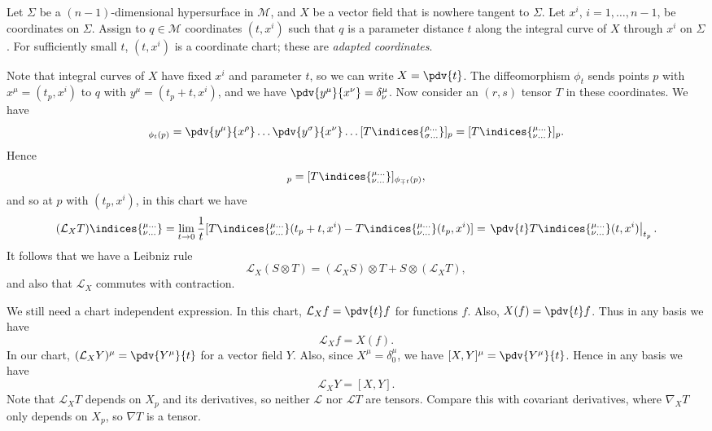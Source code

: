 \documentclass{jknotes}
\begin{document}
\begin{defn}
    Let \(\Sigma\) be a \((n-1)\)-dimensional hypersurface in \(\mathcal{M}\), and \(X\) be a vector field that is nowhere tangent to \(\Sigma\). Let \(x^i\), \(i=1,\dots,n-1\), be coordinates on \(\Sigma\). Assign to \(q\in\mathcal{M}\) coordinates \((t,x^i)\) such that \(q\) is a parameter distance \(t\) along the integral curve of \(X\) through \(x^i\) on \(\Sigma\). For sufficiently small \(t\), \((t,x^i)\) is a coordinate chart; these are \emph{adapted coordinates}.
\end{defn}
Note that integral curves of \(X\) have fixed \(x^i\) and parameter \(t\), so we can write \(X=\pdv{t}\). The diffeomorphism \(\phi_t\) sends points \(p\) with \(x^\mu = (t_p,x^i)\) to \(q\) with \(y^\mu = (t_p+t,x^i)\), and we have \(\pdv{y^\mu}{x^\nu} = \delta^\mu_\nu\). Now consider an \((r,s)\) tensor \(T\) in these coordinates. We have
\begin{equation}
    [((\phi_t)_*T)\indices{^{\mu\dots}_{\nu\dots}}]_{\phi_t(p)} = \pdv{y^\mu}{x^\rho}\dots\pdv{y^\sigma}{x^\nu}\dots[T\indices{^{\rho\dots}_{\sigma\dots}}]_p = [T\indices{^{\mu\dots}_{\nu\dots}}]_p.
\end{equation}
Hence
\begin{equation}
    [((\phi_{\pm t})_*T)\indices{^{\mu\dots}_{\nu\dots}}]_p = [T\indices{^{\mu\dots}_{\nu\dots}}]_{\phi_{\mp t}(p)},
\end{equation}
and so at \(p\) with \((t_p,x^i)\), in this chart we have
\begin{equation}
    (\mathcal{L}_XT)\indices{^{\mu\dots}_{\nu\dots}} = \lim_{t\to0}\frac1t[T\indices{^{\mu\dots}_{\nu\dots}}(t_p+t,x^i)-T\indices{^{\mu\dots}_{\nu\dots}}(t_p,x^i)] = \left.\pdv{t} T\indices{^{\mu\dots}_{\nu\dots}}(t,x^i)\right|_{t_p}.
\end{equation}
It follows that we have a Leibniz rule
\begin{equation}
    \mathcal{L}_X(S\otimes T) = (\mathcal{L}_XS)\otimes T + S\otimes(\mathcal{L}_XT),
\end{equation}
and also that \(\mathcal{L}_X\) commutes with contraction.

We still need a chart independent expression. In this chart, \(\mathcal{L}_Xf = \pdv{t}f\) for functions \(f\). Also, \(X(f) = \pdv{t}f\). Thus in any basis we have
\begin{equation}
    \mathcal{L}_Xf = X(f).
\end{equation}
In our chart, \((\mathcal{L}_XY)^\mu = \pdv{Y^\mu}{t}\) for a vector field \(Y\). Also, since \(X^\mu = \delta_0^\mu\), we have \([X,Y]^\mu = \pdv{Y^\mu}{t}\). Hence in any basis we have
\begin{equation}
    \mathcal{L}_XY = [X,Y].
\end{equation}
Note that \(\mathcal{L}_XT\) depends on \(X_p\) and its derivatives, so neither \(\mathcal{L}\) nor \(\mathcal{L}T\) are tensors. Compare this with covariant derivatives, where \(\nabla_XT\) only depends on \(X_p\), so \(\nabla T\) is a tensor.
\end{document}
